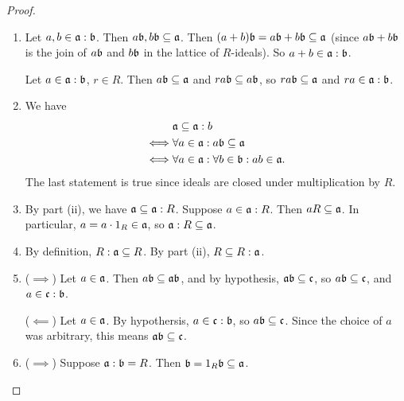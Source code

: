 \begin{proof}
  \begin{enumerate}[label=(\roman*)]
    \item Let $a, b \in \frak a : \frak b$.
          Then $a \frak b, b \frak b \subseteq \frak a$.
          Then $(a + b)\frak b = a\frak b + b\frak b \subseteq \frak a$
          (since $a\frak b + b\frak b$ is the join of $a\frak b$ and $b\frak b$ in the lattice of $R$-ideals).
          So $a + b \in \frak a : \frak b$.
          
          Let $a \in \frak a : \frak b$, $r \in R$.
          Then $a \frak b \subseteq \frak a$ and $ra \frak b \subseteq a \frak b$,
          so $ra \frak b \subseteq \frak a$ and $ra \in \frak a : \frak b$.

    \item
      We have
      \begin{align*}
             & \frak a \subseteq \frak a : b \\
        \iff & \forall a \in \frak a : a \frak b \subseteq \frak a \\
        \iff & \forall a \in \frak a : \forall b \in \frak b : ab \in \frak a.
      \end{align*}
      The last statement is true since ideals are closed under multiplication by $R$.
      
    \item
      By part (ii), we have $\frak a \subseteq \frak a : R$.
      Suppose $a \in \frak a : R$.
      Then $aR \subseteq \frak a$.
      In particular, $a = a \cdot 1_R \in \frak a$,
      so $\frak a : R \subseteq \frak a$.
      
    \item
      By definition, $R : \frak a \subseteq R$.
      By part (ii), $R \subseteq R : \frak a$.
      
    \item
      ($\implies$) Let $a \in \frak a$. Then $a \frak b \subseteq \frak a \frak b$,
      and by hypothesis, $\frak a \frak b \subseteq \frak c$,
      so $a \frak b \subseteq \frak c$,
      and $a \in \frak c : \frak b$.
      
      ($\impliedby$) Let $a \in \frak a$.
      By hypothersis, $a \in \frak c : \frak b$, so $a \frak b \subseteq \frak c$.
      Since the choice of $a$ was arbitrary, this means $\frak a \frak b \subseteq \frak c$.
      
    \item
      ($\implies$) Suppose $\frak a : \frak b = R$.
      Then $\frak b = 1_R \frak b \subseteq \frak a$.
      

\end{enumerate}
\end{proof}
